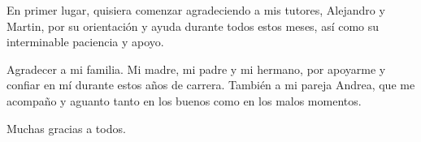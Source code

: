 \documentclass[11pt,a4paper,titlepage,oneside]{report}
\begin{document}

 
 \paxinaenbranco
 \begin{agradecementos}
 En primer lugar, quisiera comenzar agradeciendo a mis tutores, Alejandro y Martin, por su orientación y ayuda durante todos estos meses, así como su interminable paciencia y apoyo.

 Agradecer a mi familia. Mi madre, mi padre y mi hermano, por apoyarme y confiar en mí durante estos años de carrera. También a mi pareja Andrea, que me acompaño y aguanto tanto en los 
 buenos como en los malos momentos. 

 Muchas gracias a todos.

 \end{agradecementos}
 

 \setcounter{page}{1}

 \tableofcontents
 \listoffigures
 \listoftables
 \clearpage
 
 \setcounter{page}{1}


 
 
 
 
 
 


%
%

 \printglossary[type=\acronymtype,title=\nomeglosarioacronimos]
 \printglossary[title=\nomeglosariotermos]

 
 
 \clearpage
 
\end{document}
